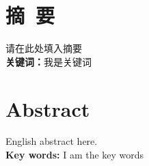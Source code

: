 
{
\section*{摘~要}

请在此处填入摘要\\ 

\noindent \textbf{关键词：}我是关键词

\clearpage

\section*{ \textbf{Abstract}}

English abstract here.\\

\noindent \textbf{Key words:} I am the key words
}

